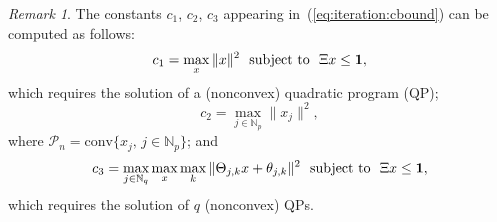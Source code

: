 \documentclass[journal]{IEEEtran}
\newcommand{\todo}[2]{%
  \providetoggle{#1}%
    \iftoggle{#1}{%
    {\color{red}#2}%
    }{#2}
}
\providecommand{\norm}[1]{\left\|#1\right\|}
\providecommand{\conv}{\text{conv}}
\newcounter{thmcount}
\theoremstyle{remark}
\newtheorem{rem}[thmcount]{Remark}
\theoremstyle{definition}
\begin{document}
\begin{rem}
The constants $c_1$, $c_2$, $c_3$ appearing in~(\ref{eq:iteration:cbound}) can be computed as follows:
\[
c_1 = \max_x \|x\|^2 \ \ \text{subject to} \ \  \Xi x\leq {\bf 1} ,
\]
which requires the solution of a (nonconvex) quadratic program (QP);
\[
c_2 = \max_{j\in\mathbb{N}_p} \|x_j\|^2 ,
\]
where 
$\mathcal{P}_n  =\conv\{x_j,\, j\in\mathbb{N}_p\}$; 
and
\[
c_3 = \max_{j\in\mathbb{N}_q} \max_x \todo{Manuel:convHull}{\max_k} \|\Theta_{j\todo{Manuel:convHull}{,k}} x + \theta_{j\todo{Manuel:convHull}{,k}}\|^2 \ \  \text{subject to} \ \ \Xi x \leq {\bf 1} ,
\]
which requires the solution of $q$ (nonconvex) QPs.
\end{rem}

\end{document}
